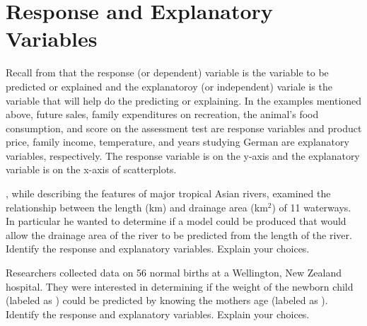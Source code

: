 \documentclass[10pt,openany]{book}\usepackage[]{graphicx}\usepackage[]{color}
\begin{document}
\vspace{-12pt}
\section{Response and Explanatory Variables}
\vspace{-12pt}
Recall from  that the response (or dependent) variable is the variable to be predicted or explained and the explanatoroy (or independent) variale is the variable that will help do the predicting or explaining.  In the examples mentioned above, future sales, family expenditures on recreation, the animal's food consumption, and score on the assessment test are response variables and product price, family income, temperature, and years studying German are explanatory variables, respectively.  The response variable is on the y-axis and the explanatory variable is on the x-axis of scatterplots.


\vspace{-12pt}

\begin{exsection}
  \item \label{revex:RegRivers1} \cite{Dudgeon2000}, while describing the features of major tropical Asian rivers, examined the relationship between the length (km) and drainage area (km$^{2}$) of 11 waterways.  In particular he wanted to determine if a model could be produced that would allow the drainage area of the river to be predicted from the length of the river.  Identify the response and explanatory variables.  Explain your choices. 
  \item \label{revex:RegBirth1} Researchers collected data on 56 normal births at a Wellington, New Zealand hospital.  They were interested in determining if the weight of the newborn child (labeled as ) could be predicted by knowing the mothers age (labeled as ).  Identify the response and explanatory variables.  Explain your choices. 
\end{exsection}
\end{document}
